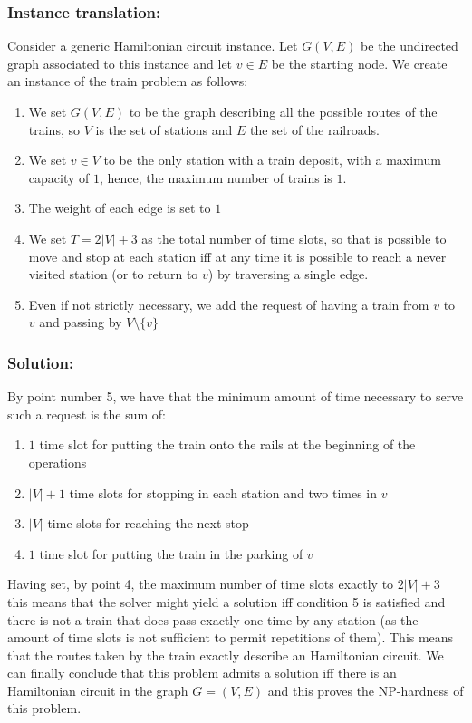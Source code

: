 \documentclass[11pt]{article}
\begin{document}
\subsubsection{Instance translation: }
Consider a generic Hamiltonian circuit instance. Let $G(V,E)$ be the undirected graph associated to this instance and 
let $v \in E$ be the starting node. We create an instance of the train problem as follows:
\begin{enumerate}
\item We set $G(V,E)$ to be the graph describing all the possible routes of the trains, so $V$ is the set of stations and $E$ the set of the railroads.
\item We set $v\in V$ to be the only station with a train deposit, with a maximum capacity of $1$, hence, the maximum number of trains is $1$.
\item The weight of each edge is set to $1$
\item We set $T=2|V|+3$ as the total number of time slots, so that is possible to move and stop at each station iff at any time it is possible to reach a never visited station (or to return to $v$) by traversing a single edge.   
\item Even if not strictly necessary, we add the request of having a train from $v$ to $v$ and passing by $V\setminus \{v\}$
\end{enumerate}
\subsubsection{Solution:}
By point number 5, we have that the minimum amount of time necessary to serve such a request is the sum of:
\begin{enumerate}
\item $1$ time slot for putting the train onto the rails at the beginning of the operations
\item $|V|+1$ time slots for stopping in each station and two times in $v$
\item $|V|$ time slots for reaching the next stop 
\item $1$ time slot for putting the train in the parking of $v$
\end{enumerate}
Having set, by point 4, the maximum number of time slots exactly to $2|V|+3$ this means that the solver might yield a solution iff condition 5 is satisfied and there is not a train 
that does pass exactly one time by any station (as the amount of time slots is not sufficient to permit repetitions of them). This means that the routes taken by the train exactly describe an Hamiltonian circuit.
We can finally conclude that this problem admits a solution iff there is an Hamiltonian circuit in the graph $G=(V,E)$ and this proves the NP-hardness of this problem.
\end{document}
